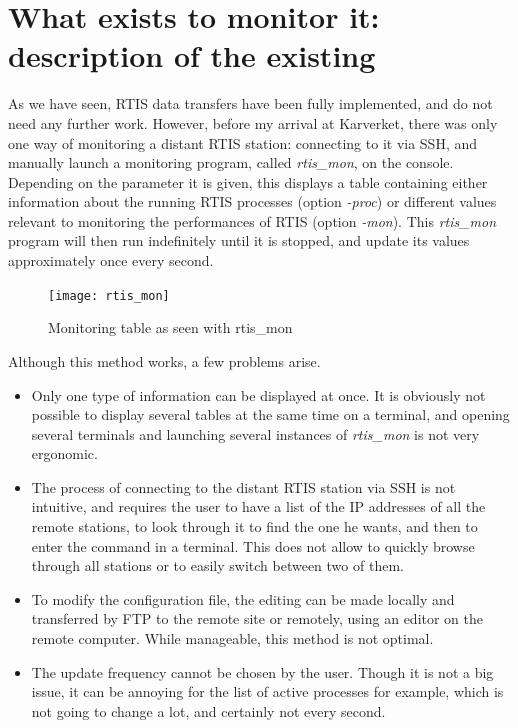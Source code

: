\documentclass{themeensg}
\begin{document}
\clearpage

\section{What exists to monitor it: description of the existing}

As we have seen, RTIS data transfers have been fully implemented, and do not need any further work. However, before my arrival at Karverket, there was only one way of monitoring a distant RTIS station: connecting to it via SSH, and manually launch a monitoring program, called \textit{rtis\_mon}, on the console. Depending on the parameter it is given, this displays a table containing either information about the running RTIS processes (option \textit{-proc}) or different values relevant to monitoring the performances of RTIS (option \textit{-mon}). This \textit{rtis\_mon} program will then run indefinitely until it is stopped, and update its values approximately once every second.\\

\begin{figure}[ht]
	\centering
	\texttt{[image: rtis\_mon]}
	\caption{Monitoring table as seen with rtis\_mon}
\end{figure}

Although this method works, a few problems arise.
\begin{itemize}
	\item Only one type of information can be displayed at once. It is obviously not possible to display several tables at the same time on a terminal, and opening several terminals and launching several instances of \textit{rtis\_mon} is not very ergonomic.
	\item The process of connecting to the distant RTIS station via SSH is not intuitive, and requires the user to have a list of the IP addresses of all the remote stations, to look through it to find the one he wants, and then to enter the command in a terminal. This does not allow to quickly browse through all stations or to easily switch between two of them.
	\item To modify the configuration file, the editing can be made locally and transferred by FTP to the remote site or remotely, using an editor on the remote computer. While manageable, this method is not optimal.
	\item The update frequency cannot be chosen by the user. Though it is not a big issue, it can be annoying for the list of active processes for example, which is not going to change a lot, and certainly not every second.
\end{itemize}
\end{document}
